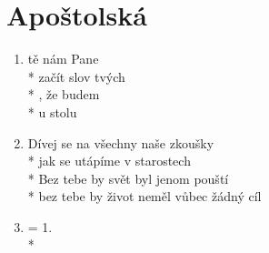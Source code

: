 \section{Apoštolská}
\begin{enumerate}
\item {} tě  nám Pane  \\*
 začít  slov tvých   \\*
, že  budem  \\*
 u  stolu     
\item Dívej se na všechny naše zkoušky \\*
jak se utápíme v starostech \\*
Bez tebe by svět byl jenom pouští \\*
bez tebe by život neměl vůbec žádný cíl 
\item = 1. \\*
\end{enumerate}
